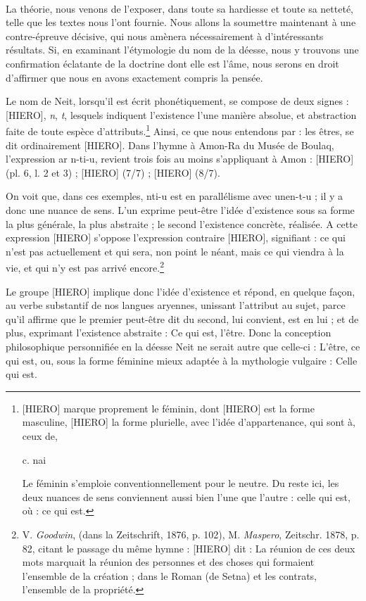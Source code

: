 \documentclass[a4paper, 11pt, oneside]{article}
\begin{document}
\paragraph{}
La théorie, nous venons de l'exposer, dans toute sa hardiesse et toute sa netteté, telle que les textes nous l'ont fournie. Nous allons la soumettre maintenant à une contre-épreuve décisive, qui nous amènera nécessairement à d'intéressants résultats. Si, en examinant l'étymologie du nom de la déesse, nous y trouvons une confirmation éclatante de la doctrine dont elle est l'âme, nous serons en droit d'affirmer que nous en avons exactement compris la pensée.

Le nom de Neit, lorsqu'il est écrit phonétiquement, se compose de deux signes : [HIERO], \emph{n}, \emph{t}, lesquels indiquent l'existence l'une manière absolue, et abstraction faite de toute espèce d'attributs.\footnote{[HIERO] marque proprement le féminin, dont [HIERO] est la forme masculine, [HIERO] la forme plurielle, avec l'idée d'appartenance, qui sont à, ceux de, \begin{coptic}c. nai\end{coptic} Le féminin s'emploie conventionnellement pour le neutre. Du reste ici, les deux nuances de sens conviennent aussi bien l'une que l'autre : celle qui est, où : ce qui est.} Ainsi, ce que nous entendons par : les êtres, se dit ordinairement [HIERO]. Dans l'hymne à Amon-Ra du Musée de Boulaq, l'expression ar n-ti-u, revient trois fois au moins s'appliquant à Amon : [HIERO] (pl. 6, l. 2 et 3) ; [HIERO] (7/7) ; [HIERO] (8/7).


On voit que, dans ces exemples, nti-u est en parallélisme avec unen-t-u ; il y a donc une nuance de sens. L'un exprime peut-être l'idée d'existence sous sa forme la plus générale, la plus abstraite ; le second l'existence concrète, réalisée. A cette expression [HIERO] s'oppose l'expression contraire [HIERO], signifiant : ce qui n'est pas actuellement et qui sera, non point le néant, mais ce qui viendra à la vie, et qui n'y est pas arrivé encore.\footnote{V. \emph{Goodwin}, (dans la Zeitschrift, 1876, p. 102), M. \emph{Maspero}, Zeitschr. 1878, p. 82, citant le passage du même hymne : [HIERO] dit : La réunion de ces deux mots marquait la réunion des personnes et des choses qui formaient l'ensemble de la création ; dans le Roman (de Setna) et les contrats, l'ensemble de la propriété.}

Le groupe [HIERO] implique donc l'idée d'existence et répond, en quelque façon, au verbe substantif de nos langues aryennes, unissant l'attribut au sujet, parce qu’il affirme que le premier peut-être dit du second, lui convient, est en lui ; et de plus, exprimant l'existence abstraite : Ce qui est, l'être. Donc la conception philosophique personnifiée en la déesse Neit ne serait autre que celle-ci : L'être, ce qui est, ou, sous la forme féminine mieux adaptée à la mythologie vulgaire : Celle qui est.
\end{document}
